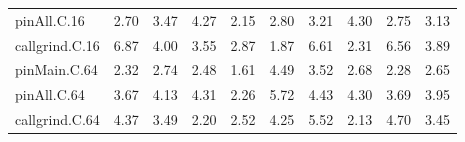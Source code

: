 \begin{table*}[]
\begin{center}
\begin{tabular}{|l|rrrrrrrr|r|}
 pinAll.C.16    & 2.70 & 3.47 &  4.27 &  2.15 & 2.80 & 3.21 & 4.30 & 2.75 & 3.13 \\
 callgrind.C.16 & 6.87 & 4.00 &  3.55 &  2.87 & 1.87 & 6.61 & 2.31 & 6.56 & 3.89 \\
\hline
 pinMain.C.64   & 2.32 & 2.74 &  2.48 &  1.61 & 4.49 & 3.52 & 2.68 & 2.28 & 2.65 \\
 pinAll.C.64    & 3.67 & 4.13 &  4.31 &  2.26 & 5.72 & 4.43 & 4.30 & 3.69 & 3.95 \\
 callgrind.C.64 & 4.37 & 3.49 &  2.20 &  2.52 & 4.25 & 5.52 & 2.13 & 4.70 & 3.45 \\
\hline
\end{tabular}
\end{center}
\end{table*}

\fi




\iftrue

